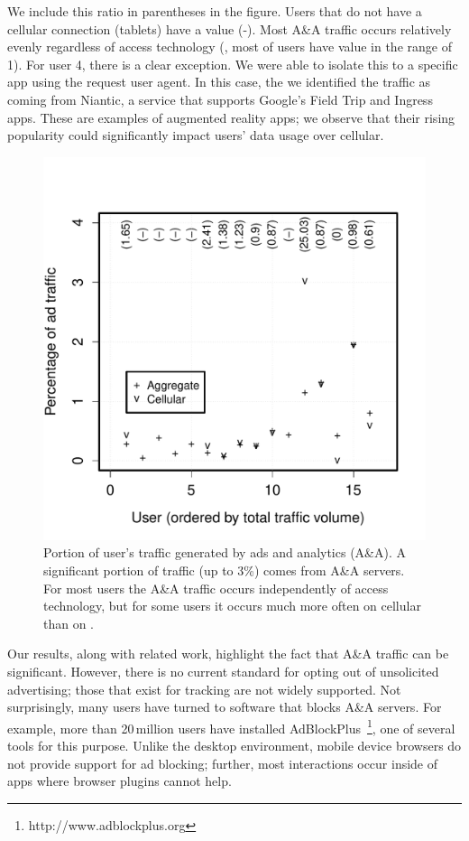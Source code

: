 We include this ratio in parentheses in the figure. Users that do not have a cellular connection (tablets) have a value (-).
Most A\&A traffic occurs relatively evenly regardless of access technology (\ie, most of users have value in the range of 1).
For user 4, there is a clear exception. We were able to isolate this to a 
specific app using the request user agent. In this case, the we identified the traffic as 
coming from Niantic, a service that supports Google's Field Trip and Ingress apps. These 
are examples of augmented reality apps; we observe that their rising popularity could significantly 
impact users' data usage over cellular. 


\begin{figure}
\vspace{-2.5em}
\centering
        \includegraphics[width=\linewidth]{./plots/userAdsShare}
  \caption{Portion of user's traffic generated by ads and analytics (A\&A). A significant 
  portion of traffic (up to 3\%) comes from A\&A servers. For most users the A\&A 
  traffic occurs independently of access technology, but for some users it occurs 
  much more often on cellular than on \wifi. }
  \label{fig:adblocking}
   \vspace{\postfigspace}
\end{figure}


Our results, along with related work, highlight the fact that A\&A traffic can be 
significant. However, there is no current standard for opting 
out of unsolicited advertising; those that exist for tracking are not widely supported. 
Not surprisingly, many users have turned to software that blocks A\&A servers. 
For example, more than 20\,million users have installed 
AdBlockPlus~\footnote{http://www.adblockplus.org}, one of several tools for this purpose. 
Unlike the desktop environment, mobile device browsers do not provide support for 
ad blocking; further, most interactions occur inside of apps where browser plugins 
cannot help. 

